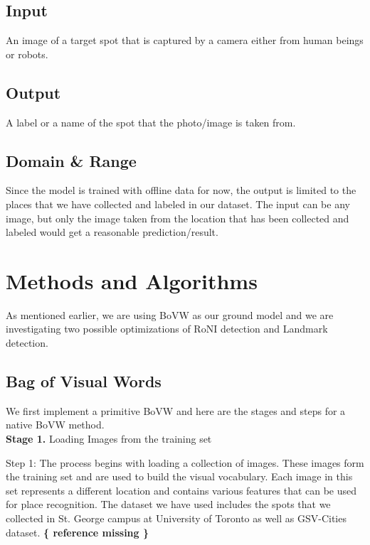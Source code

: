 \documentclass[conference]{IEEEtran}
\begin{document}
\subsection{Input}

An image of a target spot that is captured by a camera either from human beings or robots.

\subsection{Output}

A label or a name of the spot that the photo/image is taken from.

\subsection{Domain \& Range}

Since the model is trained with offline data for now, the output is limited to the places that we have collected and labeled in our dataset. The input can be any image, but only the image taken from the location that has been collected and labeled would get a reasonable prediction/result.

\section{Methods and Algorithms}

As mentioned earlier, we are using BoVW as our ground model and we are investigating two possible optimizations of RoNI detection and Landmark detection.

\subsection{Bag of Visual Words}

We first implement a primitive BoVW and here are the stages and steps for a native BoVW method. \\

\textbf{Stage 1.} Loading Images from the training set

Step 1: The process begins with loading a collection of images. These images form the training set and are used to build the visual vocabulary. Each image in this set represents a different location and contains various features that can be used for place recognition. The dataset we have used includes the spots that we collected in St. George campus at University of Toronto as well as GSV-Cities dataset. \textbf{ \{ reference missing \} }
\\
\end{document}
